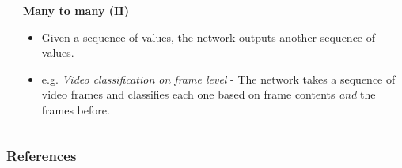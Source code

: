 \documentclass{beamer}
\begin{document}
\begin{frame}[allowframebreaks]
\begin{columns}
\begin{column}{0.3\textwidth}
    \end{column}
    \begin{column}{0.7\textwidth}
      \begin{center}
        \textbf{Many to many (II)}
      \end{center}
      \begin{itemize}
        \item Given a sequence of values, the network outputs another sequence of values.
        \item e.g. \textit{Video classification on frame level} - The network takes a sequence of video frames and classifies each one based on frame contents \textit{and} the frames before.
      \end{itemize}
    \end{column}
  \end{columns}
\end{frame}
\begin{frame}[allowframebreaks]
  \frametitle{References}
  
  
\end{frame}
\end{document}
